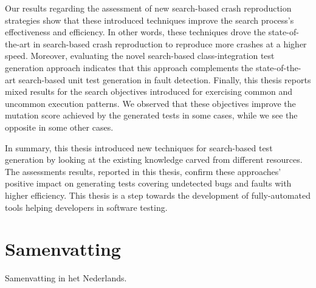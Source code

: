 Our results regarding the assessment of new search-based crash reproduction strategies show that these introduced techniques improve the search process's effectiveness and efficiency. In other words, these techniques drove the state-of-the-art in search-based crash reproduction to reproduce more crashes at a higher speed. 
Moreover, evaluating the novel search-based class-integration test generation approach indicates that this approach complements the state-of-the-art search-based unit test generation in fault detection. 
Finally, this thesis reports mixed results for the search objectives introduced for exercising common and uncommon execution patterns. We observed that these objectives improve the mutation score achieved by the generated tests in some cases, while we see the opposite in some other cases.

In summary, this thesis introduced new techniques for search-based test generation by looking at the existing knowledge carved from different resources. The assessments results, reported in this thesis, confirm these approaches' positive impact on generating tests covering undetected bugs and faults with higher efficiency. This thesis is a step towards the development of fully-automated tools helping developers in software testing.
\chapter*{Samenvatting}

{

  Samenvatting in het Nederlands.
}



